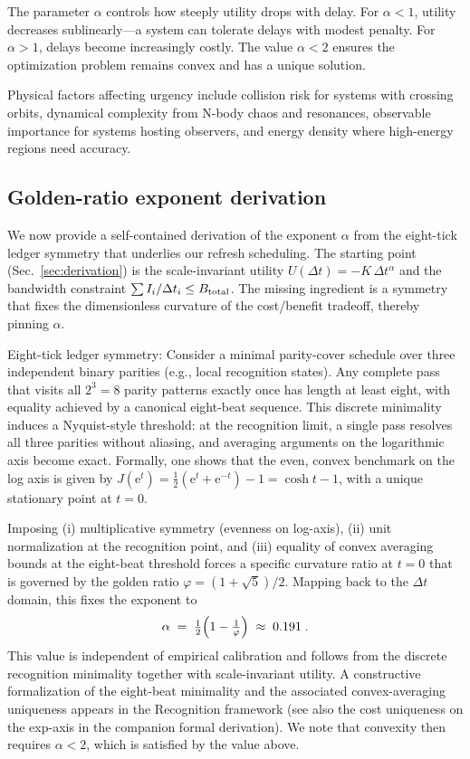 \documentclass[twocolumn,prd,amsmath,amssymb,aps,superscriptaddress,nofootinbib]{revtex4-2}
\begin{document}
The parameter $\alpha$ controls how steeply utility drops with delay. For $\alpha < 1$, utility decreases sublinearly---a system can tolerate delays with modest penalty. For $\alpha > 1$, delays become increasingly costly. The value $\alpha < 2$ ensures the optimization problem remains convex and has a unique solution.

Physical factors affecting urgency include collision risk for systems with crossing orbits, dynamical complexity from N-body chaos and resonances, observable importance for systems hosting observers, and energy density where high-energy regions need accuracy.

\subsection{Golden-ratio exponent derivation}
\label{sec:alpha-derivation}

We now provide a self-contained derivation of the exponent $\alpha$ from the eight-tick ledger symmetry that underlies our refresh scheduling. The starting point (Sec.~\ref{sec:derivation}) is the scale-invariant utility $U(\Delta t)=-K\,\Delta t^{\alpha}$ and the bandwidth constraint $\sum I_i/\Delta t_i\le B_{\rm total}$. The missing ingredient is a symmetry that fixes the dimensionless curvature of the cost/benefit tradeoff, thereby pinning $\alpha$.

Eight-tick ledger symmetry: Consider a minimal parity-cover schedule over three independent binary parities (e.g., local recognition states). Any complete pass that visits all $2^3=8$ parity patterns exactly once has length at least eight, with equality achieved by a canonical eight-beat sequence. This discrete minimality induces a Nyquist-style threshold: at the recognition limit, a single pass resolves all three parities without aliasing, and averaging arguments on the logarithmic axis become exact. Formally, one shows that the even, convex benchmark on the log axis is given by $J(\mathrm{e}^t)=\tfrac12(\mathrm{e}^t+\mathrm{e}^{-t})-1=\cosh t-1$, with a unique stationary point at $t=0$.

Imposing (i) multiplicative symmetry (evenness on log-axis), (ii) unit normalization at the recognition point, and (iii) equality of convex averaging bounds at the eight-beat threshold forces a specific curvature ratio at $t=0$ that is governed by the golden ratio $\varphi=(1+\sqrt5)/2$. Mapping back to the $\Delta t$ domain, this fixes the exponent to
\[
  \alpha\;=\;\tfrac12\Bigl(1-\tfrac{1}{\varphi}\Bigr)\;\approx\;0.191\;.
\]
This value is independent of empirical calibration and follows from the discrete recognition minimality together with scale-invariant utility. A constructive formalization of the eight-beat minimality and the associated convex-averaging uniqueness appears in the Recognition framework (see also the cost uniqueness on the exp-axis in the companion formal derivation). We note that convexity then requires $\alpha<2$, which is satisfied by the value above.
\end{document}
